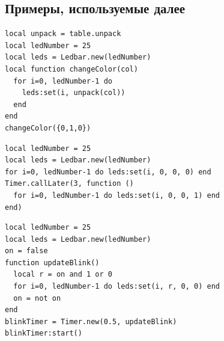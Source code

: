 \subsection{Примеры, используемые далее}
\begin{verbatim}
local unpack = table.unpack
local ledNumber = 25
local leds = Ledbar.new(ledNumber)
local function changeColor(col)
  for i=0, ledNumber-1 do
    leds:set(i, unpack(col))
  end
end
changeColor({0,1,0})
\end{verbatim}
\begin{verbatim}
local ledNumber = 25
local leds = Ledbar.new(ledNumber)
for i=0, ledNumber-1 do leds:set(i, 0, 0, 0) end
Timer.callLater(3, function ()
  for i=0, ledNumber-1 do leds:set(i, 0, 0, 1) end
end)
\end{verbatim}
\begin{verbatim}
local ledNumber = 25
local leds = Ledbar.new(ledNumber)
on = false
function updateBlink()
  local r = on and 1 or 0
  for i=0, ledNumber-1 do leds:set(i, r, 0, 0) end
  on = not on
end
blinkTimer = Timer.new(0.5, updateBlink)
blinkTimer:start()
\end{verbatim}

